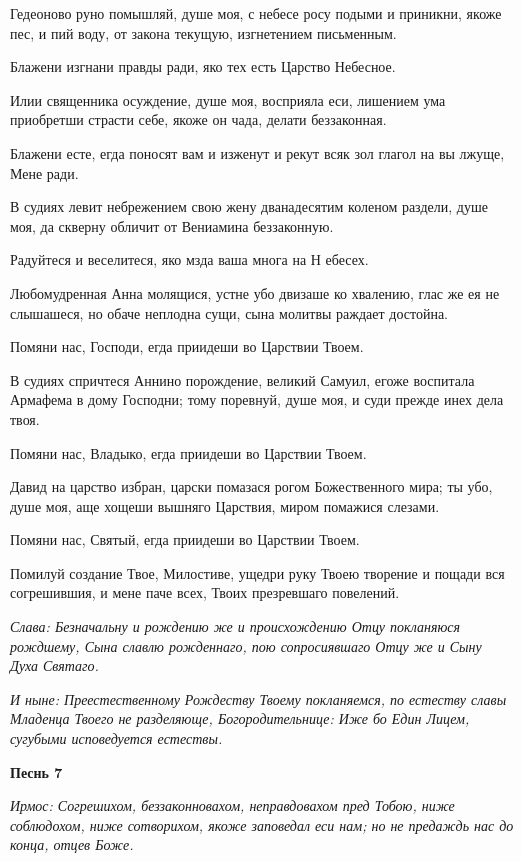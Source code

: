 Гедеоново руно помышляй, душе моя, с небесе росу подыми и приникни, якоже пес, и пий воду, от закона текущую, изгнетением письменным.


Блажени изгнани правды ради, яко тех есть Царство Небесное.


Илии священника осуждение, душе моя, восприяла еси, лишением ума приобретши страсти себе, якоже он чада, делати беззаконная.


Блажени есте, егда поносят вам и изженут и рекут всяк зол глагол на вы лжуще, Мене ради.


В судиях левит небрежением свою жену дванадесятим коленом раздели, душе моя, да скверну обличит от Вениамина беззаконную.


Радуйтеся и веселитеся, яко мзда ваша многа на Н ебесех.


Любомудренная Анна молящися, устне убо двизаше ко хвалению, глас же ея не слышашеся, но обаче неплодна сущи, сына молитвы раждает достойна.


Помяни нас, Господи, егда приидеши во Царствии Твоем.


В судиях спричтеся Аннино порождение, великий Самуил, егоже воспитала Армафема в дому Господни; тому поревнуй, душе моя, и суди прежде инех дела твоя.


Помяни нас, Владыко, егда приидеши во Царствии Твоем.


Давид на царство избран, царски помазася рогом Божественного мира; ты убо, душе моя, аще хощеши вышняго Царствия, миром помажися слезами.


Помяни нас, Святый, егда приидеши во Царствии Твоем.


Помилуй создание Твое, Милостиве, ущедри руку Твоею творение и пощади вся согрешившия, и мене паче всех, Твоих презревшаго повелений.


\itshape Слава\normalfont{}: Безначальну и рождению же и происхождению Отцу покланяюся рождшему, Сына славлю рожденнаго, пою сопросиявшаго Отцу же и Сыну Духа Святаго.


\itshape И ныне\normalfont{}: Преестественному Рождеству Твоему покланяемся, по естеству славы Младенца Твоего не разделяюще, Богородительнице: Иже бо Един Лицем, сугубыми исповедуется естествы. 


\medskip
\bfseries Песнь 7\normalfont{}


\itshape Ирмос\normalfont{}: Согрешихом, беззаконновахом, неправдовахом пред Тобою, ниже соблюдохом, ниже сотворихом, якоже заповедал еси нам; но не предаждь нас до конца, отцев Боже.


